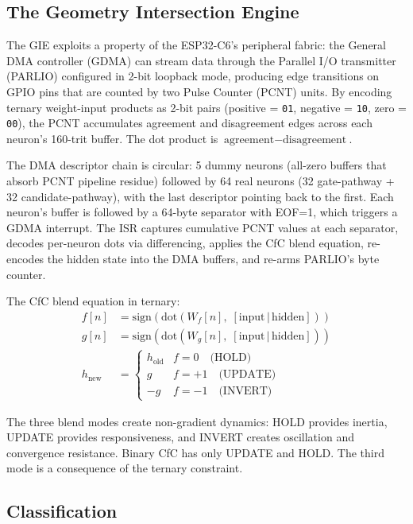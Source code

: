 \documentclass[11pt,letterpaper]{article}
\begin{document}
\subsection{The Geometry Intersection Engine}

The GIE exploits a property of the ESP32-C6's peripheral fabric: the General DMA controller (GDMA) can stream data through the Parallel I/O transmitter (PARLIO) configured in 2-bit loopback mode, producing edge transitions on GPIO pins that are counted by two Pulse Counter (PCNT) units. By encoding ternary weight-input products as 2-bit pairs (positive = \texttt{01}, negative = \texttt{10}, zero = \texttt{00}), the PCNT accumulates agreement and disagreement edges across each neuron's 160-trit buffer. The dot product is $\text{agreement} - \text{disagreement}$.

The DMA descriptor chain is circular: 5 dummy neurons (all-zero buffers that absorb PCNT pipeline residue) followed by 64 real neurons (32 gate-pathway + 32 candidate-pathway), with the last descriptor pointing back to the first. Each neuron's buffer is followed by a 64-byte separator with EOF=1, which triggers a GDMA interrupt. The ISR captures cumulative PCNT values at each separator, decodes per-neuron dots via differencing, applies the CfC blend equation, re-encodes the hidden state into the DMA buffers, and re-arms PARLIO's byte counter.

The CfC blend equation in ternary:
\begin{align*}
f[n] &= \text{sign}(\text{dot}(W_f[n],\; [\text{input}\,|\,\text{hidden}])) \\
g[n] &= \text{sign}(\text{dot}(W_g[n],\; [\text{input}\,|\,\text{hidden}])) \\
h_{\text{new}} &= \begin{cases}
  h_{\text{old}} & f = 0 \quad \text{(HOLD)} \\
  g & f = +1 \quad \text{(UPDATE)} \\
  -g & f = -1 \quad \text{(INVERT)}
\end{cases}
\end{align*}

The three blend modes create non-gradient dynamics: HOLD provides inertia, UPDATE provides responsiveness, and INVERT creates oscillation and convergence resistance. Binary CfC has only UPDATE and HOLD. The third mode is a consequence of the ternary constraint.

\subsection{Classification}
\end{document}
